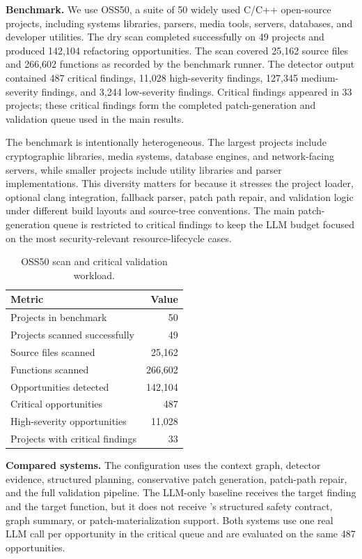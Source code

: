 \noindent\textbf{Benchmark.}
We use OSS50, a suite of 50 widely used C/C++ open-source projects, including
systems libraries, parsers, media tools, servers, databases, and developer
utilities. The dry scan completed successfully on 49 projects and produced
142,104 refactoring opportunities. The scan covered 25,162 source files and
266,602 functions as recorded by the benchmark runner. The detector output
contained 487 critical findings, 11,028 high-severity findings, 127,345
medium-severity findings, and 3,244 low-severity findings. Critical findings
appeared in 33 projects; these critical findings form the completed
patch-generation and validation queue used in the main results.

The benchmark is intentionally heterogeneous. The largest projects include
cryptographic libraries, media systems, database engines, and network-facing
servers, while smaller projects include utility libraries and parser
implementations. This diversity matters for \SysName{} because it stresses the
project loader, optional clang integration, fallback parser, patch path repair,
and validation logic under different build layouts and source-tree conventions.
The main patch-generation queue is restricted to critical findings to keep the
LLM budget focused on the most security-relevant resource-lifecycle cases.

\begin{table}[t]
  \centering
  \caption{OSS50 scan and critical validation workload.}
  \label{tab:eval-workload}
  \footnotesize
  \begin{tabular}{@{}lr@{}}
    \toprule
    \textbf{Metric} & \textbf{Value} \\
    \midrule
    Projects in benchmark & 50 \\
    Projects scanned successfully & 49 \\
    Source files scanned & 25,162 \\
    Functions scanned & 266,602 \\
    Opportunities detected & 142,104 \\
    Critical opportunities & 487 \\
    High-severity opportunities & 11,028 \\
    Projects with critical findings & 33 \\
    \bottomrule
  \end{tabular}
\end{table}

\noindent\textbf{Compared systems.}
The \SysName{} configuration uses the context graph, detector evidence,
structured planning, conservative patch generation, patch-path repair, and the
full validation pipeline. The LLM-only baseline receives the target finding and
the target function, but it does not receive \SysName{}'s structured safety
contract, graph summary, or patch-materialization support. Both systems use one
real LLM call per opportunity in the critical queue and are evaluated on the
same 487 opportunities.

